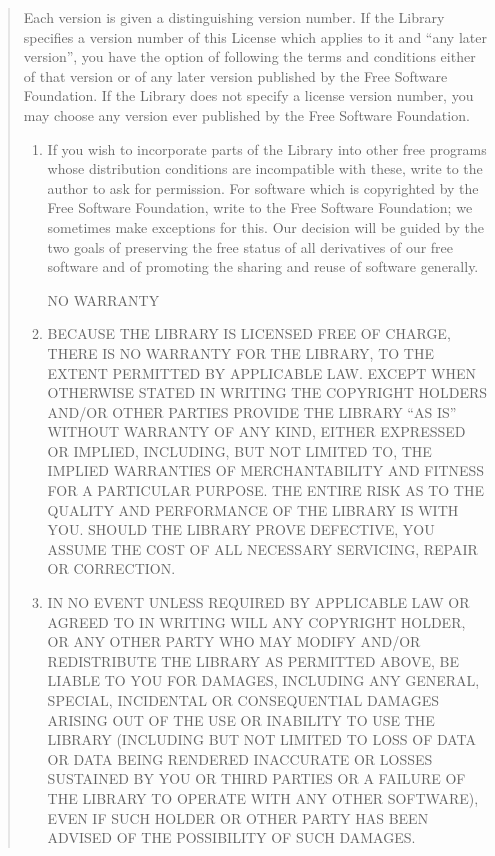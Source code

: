 \documentclass[
]{book}
\theoremstyle{definition}
\theoremstyle{definition}
\theoremstyle{definition}
\theoremstyle{definition}
\theoremstyle{remark}
\begin{document}
\begin{quote}
Each version is given a distinguishing version number. If the
Library specifies a version number of this License which applies
to it and ``any later version'', you have the option of following
the terms and conditions either of that version or of any later
version published by the Free Software Foundation. If the
Library does not specify a license version number, you may
choose any version ever published by the Free Software
Foundation.

\begin{enumerate}
\def\labelenumi{\arabic{enumi}.}
\setcounter{enumi}{13}
\item
  If you wish to incorporate parts of the Library into other
  free programs whose distribution conditions are incompatible
  with these, write to the author to ask for permission. For
  software which is copyrighted by the Free Software Foundation,
  write to the Free Software Foundation; we sometimes make
  exceptions for this. Our decision will be guided by the two
  goals of preserving the free status of all derivatives of our
  free software and of promoting the sharing and reuse of software
  generally.

  NO WARRANTY
\item
  BECAUSE THE LIBRARY IS LICENSED FREE OF CHARGE, THERE IS NO
  WARRANTY FOR THE LIBRARY, TO THE EXTENT PERMITTED BY APPLICABLE LAW.
  EXCEPT WHEN OTHERWISE STATED IN WRITING THE COPYRIGHT HOLDERS AND/OR
  OTHER PARTIES PROVIDE THE LIBRARY ``AS IS'' WITHOUT WARRANTY OF ANY KIND,
  EITHER EXPRESSED OR IMPLIED, INCLUDING, BUT NOT LIMITED TO, THE
  IMPLIED WARRANTIES OF MERCHANTABILITY AND FITNESS FOR A PARTICULAR
  PURPOSE. THE ENTIRE RISK AS TO THE QUALITY AND PERFORMANCE OF THE
  LIBRARY IS WITH YOU. SHOULD THE LIBRARY PROVE DEFECTIVE, YOU ASSUME
  THE COST OF ALL NECESSARY SERVICING, REPAIR OR CORRECTION.
\item
  IN NO EVENT UNLESS REQUIRED BY APPLICABLE LAW OR AGREED TO IN
  WRITING WILL ANY COPYRIGHT HOLDER, OR ANY OTHER PARTY WHO MAY MODIFY
  AND/OR REDISTRIBUTE THE LIBRARY AS PERMITTED ABOVE, BE LIABLE TO YOU
  FOR DAMAGES, INCLUDING ANY GENERAL, SPECIAL, INCIDENTAL OR CONSEQUENTIAL
  DAMAGES ARISING OUT OF THE USE OR INABILITY TO USE THE
  LIBRARY (INCLUDING BUT NOT LIMITED TO LOSS OF DATA OR DATA BEING
  RENDERED INACCURATE OR LOSSES SUSTAINED BY YOU OR THIRD PARTIES OR A
  FAILURE OF THE LIBRARY TO OPERATE WITH ANY OTHER SOFTWARE), EVEN IF
  SUCH HOLDER OR OTHER PARTY HAS BEEN ADVISED OF THE POSSIBILITY OF SUCH DAMAGES.
\end{enumerate}


\end{quote}
\end{document}

